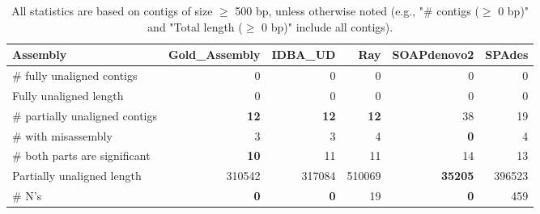 \documentclass[12pt,a4paper]{article}
\begin{document}
\begin{table}[ht]
\begin{center}
\caption{All statistics are based on contigs of size $\geq$ 500 bp, unless otherwise noted (e.g., "\# contigs ($\geq$ 0 bp)" and "Total length ($\geq$ 0 bp)" include all contigs).}
\begin{tabular}{|l*{5}{|r}|}
\hline
Assembly & Gold\_Assembly & IDBA\_UD & Ray & SOAPdenovo2 & SPAdes \\ \hline
\# fully unaligned contigs & 0 & 0 & 0 & 0 & 0 \\ \hline
Fully unaligned length & 0 & 0 & 0 & 0 & 0 \\ \hline
\# partially unaligned contigs & {\bf 12} & {\bf 12} & {\bf 12} & 38 & 19 \\ \hline
\hspace{5mm}\# with misassembly & 3 & 3 & 4 & {\bf 0} & 4 \\ \hline
\hspace{5mm}\# both parts are significant & {\bf 10} & 11 & 11 & 14 & 13 \\ \hline
Partially unaligned length & 310542 & 317084 & 510069 & {\bf 35205} & 396523 \\ \hline
\# N's & {\bf 0} & {\bf 0} & 19 & {\bf 0} & 459 \\ \hline
\end{tabular}
\end{center}
\end{table}
\end{document}
